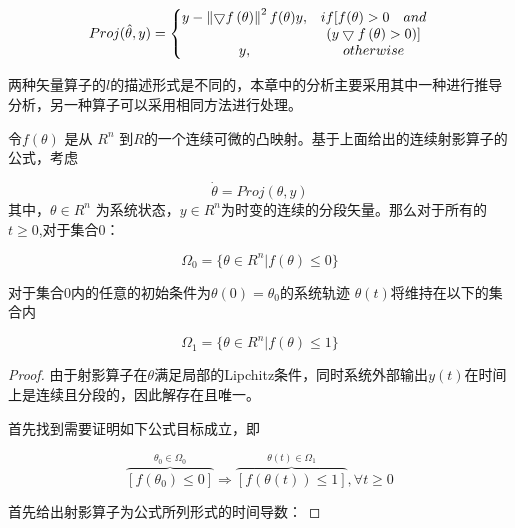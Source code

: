 \begin{equation}
\label{eq018}
Proj(\hat \theta, y) = \left\{\begin{matrix}
y- \left \|   \bigtriangledown f\left ( \theta \right ) \right \| ^2 f(\theta) y, & if [f( \theta) > 0   \quad and  \\
  &  (y\bigtriangledown f\left ( \theta \right ) >0 )]\\
y, & otherwise \\
\end{matrix}\right.\\
\end{equation}

两种矢量算子的$l$的描述形式是不同的，本章中的分析主要采用其中一种进行推导分析，另一种算子可以采用相同方法进行处理。


\begin{lem}

令$f(\theta)$ 是从 $R^n$ 到$R$的一个连续可微的凸映射。基于上面给出的连续射影算子的公式，考虑

\begin{equation}
\dot \theta = Proj(\theta, y)
\end{equation}
其中，$\theta \in R^n$ 为系统状态，$y \in R^n$为时变的连续的分段矢量。那么对于所有的$t \geq 0$,对于集合0：

\begin{equation}
\Omega_0 = \{ \theta \in R^n | f(\theta) \leq 0\}
\end{equation}

对于集合0内的任意的初始条件为$\theta(0)=\theta_0$的系统轨迹 $\theta(t)$将维持在以下的集合内

\begin{equation}
\Omega_1 = \{ \theta \in R^n | f(\theta) \leq 1\}
\end{equation}

\begin{proof}

由于射影算子在$\theta$满足局部的Lipchitz条件\cite{lavretsky2013robust}，同时系统外部输出$y(t)$在时间上是连续且分段的，因此解存在且唯一。

首先找到需要证明如下公式目标成立，即

\begin{equation}
\overbrace{[f(\theta_0) \leq 0 ]}^{\theta_0 \in \Omega_0} \Rightarrow \overbrace{[f(\theta(t)) \leq 1]}^{\theta(t)\in \Omega_1}, \forall t \geq 0
\end{equation}

首先给出射影算子为公式所列形式的时间导数：


\end{proof}
\end{lem}
